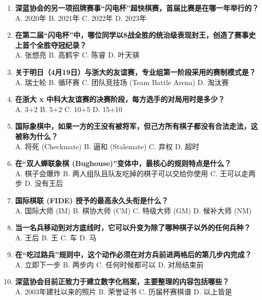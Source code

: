 \documentclass[a4paper, 11pt]{ctexart}
\begin{document}
\begin{enumerate}[label=\arabic*., itemsep=1.5em]
    \item \textbf{深蓝协会的另一项招牌赛事“闪电杯”超快棋赛，首届比赛是在哪一年举行的？} \\
    A. 2020年 \qquad B. 2021年 \qquad C. 2022年 \qquad D. 2023年

    \item \textbf{在第二届“闪电杯”中，哪位同学以8战全胜的统治级表现封王，创造了赛事史上首个全胜夺冠纪录？} \\
    A. 张想亮 \qquad B. 高鹤宇 \qquad C. 陈睿 \qquad D. 叶天骐

    \item \textbf{关于明日（4月19日）与浙大的友谊赛，专业组第一阶段采用的赛制模式是？} \\
    A. 瑞士轮 \qquad B. 循环赛 \qquad C. 团队竞技场 (Team Battle Arena) \qquad D. 淘汰赛

    \item \textbf{在浙大 x 中科大友谊赛的决赛阶段，每方选手的对局用时是多少？} \\
    A. 3+2 \qquad B. 5+2 \qquad C. 10+5 \qquad D. 15+10

    \item \textbf{国际象棋中，如果一方的王没有被将军，但己方所有棋子都没有合法走法，这被称为什么？} \\
    A. 将死 (Checkmate) \qquad B. 逼和 (Stalemate) \qquad C. 弃权 \qquad D. 超时

    \item \textbf{在“双人蝉联象棋 (Bughouse)”变体中，最核心的规则特点是什么？} \\
    A. 棋子会爆炸 \qquad B. 两人组队且队友吃掉的棋子可以交给你使用 \qquad C. 王可以走两步 \qquad D. 没有王后

    \item \textbf{国际棋联 (FIDE) 授予的最高永久头衔是什么？} \\
    A. 国际大师 (IM) \qquad B. 棋协大师 (CM) \qquad C. 特级大师 (GM) \qquad D. 候补大师 (NM)

    \item \textbf{当一名兵移动到对方底线时，它可以升变为除了哪种棋子以外的任何兵种？} \\
    A. 王后 \qquad B. 王 \qquad C. 车 \qquad D. 马

    \item \textbf{在“吃过路兵”规则中，这个动作必须在对方兵前进两格后的第几步内完成？} \\
    A. 立即下一步 \qquad B. 两步内 \qquad C. 任何时候都可以 \qquad D. 对局结束前

    \item \textbf{深蓝协会目前正致力于建立数字化档案，主要整理的内容包括哪些？} \\
    A. 2003年建社以来的照片 \quad B. 荣誉证书 \quad C. 历届杯赛棋谱 \quad D. 以上皆是


\end{enumerate}
\end{document}
